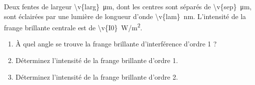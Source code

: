 Deux fentes de largeur \qty{\v{larg}}{\micro\metre}, dont les centres sont séparés de \qty{\v{sep}}{\micro\metre}, sont éclairées par une lumière de longueur d'onde \qty{\v{lam}}{nm}. L'intensité de la frange brillante centrale est de \qty{\v{I0}}{W/m^2}.

\begin{enumerate}[label=\alph*)]
    \item À quel angle se trouve la frange brillante d'interférence d'ordre 1 ?
    \item Déterminez l'intensité de la frange brillante d'ordre 1.
    \item Déterminez l'intensité de la frange brillante d'ordre 2.
\end{enumerate}
